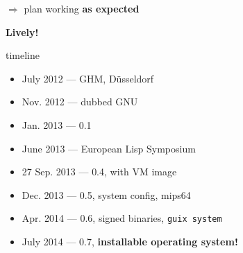 \documentclass{beamer}
\begin{document}

\begin{frame}[plain]
  \Large{$\Rightarrow$ plan working
    \textbf{as expected}}
  \\[1cm]
\end{frame}

\begin{frame}[plain]
  \begin{centering}
    \Huge{\textbf{Lively!}}
  \end{centering}
\end{frame}

\begin{frame}{timeline}
  \begin{itemize}
    \item July 2012 --- GHM, Düsseldorf
    \item Nov. 2012 --- dubbed GNU
    \item{Jan. 2013 --- \alert{0.1}}
    \item{June 2013 --- European Lisp Symposium}
    \item{27 Sep. 2013 --- \alert{0.4}, with VM image}
    \item{Dec. 2013 --- \alert{0.5}, system config, mips64}
    \item{Apr. 2014 --- \alert{0.6}, signed binaries, \texttt{guix
        system}}
    \item<2>{July 2014 --- \alert{0.7}, \textbf{installable operating
        system!}}
  \end{itemize}
\end{frame}
\end{document}
